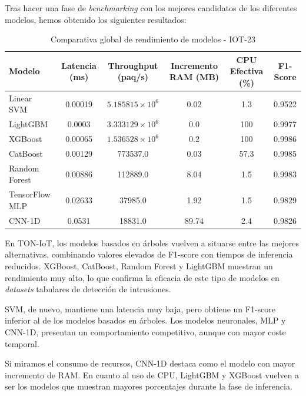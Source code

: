 Tras hacer una fase de \textit{benchmarking} con los mejores candidatos de los diferentes modelos, hemos obtenido los siguientes resultados:

\begin{table}[H]
    \centering
    \small
    \begin{tabular}{|l|c|c|c|c|c|}
        \hline
        \textbf{Modelo} & \textbf{Latencia (ms)} & \textbf{Throughput (paq/s)} & \textbf{Incremento RAM (MB)} & \textbf{CPU Efectiva (\%)} & \textbf{F1-Score} \\
        \hline
        Linear SVM & 0.00019 & $5.185815 \times 10^{6}$ & 0.02 & 1.3 & 0.9522 \\
        \hline
        LightGBM & 0.0003 & $3.333129 \times 10^{6}$ & 0.0 & 100 & 0.9977 \\
        \hline
        XGBoost & 0.00065 & $1.536528 \times 10^{6}$ & 0.2 & 100 & 0.9986 \\
        \hline
        CatBoost & 0.00129 & 773537.0 & 0.03 & 57.3 & 0.9985 \\
        \hline
        Random Forest & 0.00886 & 112889.0 & 8.04 & 1.5 & 0.9983 \\
        \hline
        TensorFlow MLP & 0.02633 & 37985.0 & 1.92 & 1.5 & 0.9829 \\
        \hline
        CNN-1D & 0.0531 & 18831.0 & 89.74 & 2.4 & 0.9826 \\
        \hline
    \end{tabular}
    \caption{Comparativa global de rendimiento de modelos - IOT-23}
    \label{tab:hardware_benchmark_global_ton}
\end{table}

En TON-IoT, los modelos basados en árboles vuelven a situarse entre las mejores alternativas, combinando valores elevados de F1-score con tiempos de inferencia reducidos. XGBoost, CatBoost, Random Forest y LightGBM muestran un rendimiento muy alto, lo que confirma la eficacia de este tipo de modelos en \textit{datasets} tabulares de detección de intrusiones.

SVM, de nuevo, mantiene una latencia muy baja, pero obtiene un F1-score inferior al de los modelos basados en árboles. Los modelos neuronales, MLP y CNN-1D, presentan un comportamiento competitivo, aunque con mayor coste temporal. 

Si miramos el consumo de recursos, CNN-1D destaca como el modelo con mayor incremento de RAM. En cuanto al uso de CPU, LightGBM y XGBoost vuelven a ser los modelos que muestran mayores porcentajes durante la fase de inferencia.

